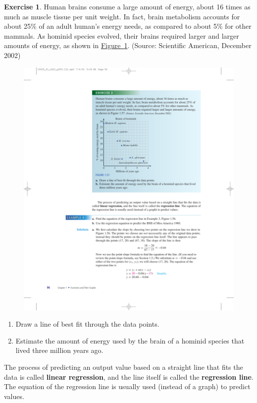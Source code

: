 \documentclass[10pt,]{book}
\newcommand{\terminology}[1]{\textbf{#1}}
\theoremstyle{plain}
\theoremstyle{definition}
\theoremstyle{definition}
\theoremstyle{definition}
\theoremstyle{definition}
\newtheorem{exercise}[theorem]{Exercise}
\numberwithin{equation}{part}
\begin{document}
\begin{exercise}\label{hominid-brains}
Human brains consume a large amount of energy, about 16 times as much as muscle tissue per unit weight. In fact, brain metabolism accounts for about 25\% of an adult human’s energy needs, as compared to about 5\% for other mammals. As hominid species evolved, their brains required larger and larger amounts of energy, as shown in \hyperref[fig-hominid-brains]{Figure~\ref{fig-hominid-brains}}. (Source: Scientific American, December 2002) \begin{figure}
\centering
\includegraphics[width=0.8\linewidth]{images/fig-hominid-brains}
\caption{\label{fig-hominid-brains}}
\end{figure}
 \leavevmode%
\begin{enumerate}[label=*\alph**]
\item\hypertarget{li-1307}{}Draw a line of best fit through the data points.%
\item\hypertarget{li-1308}{}Estimate the amount of energy used by the brain of a hominid species that lived three million years ago.%
\end{enumerate}
%
\end{exercise}
The process of predicting an output value based on a straight line that fits the data is called \terminology{linear regression}, and the line itself is called the \terminology{regression line}. The equation of the regression line is usually used (instead of a graph) to predict values.%
\end{document}
